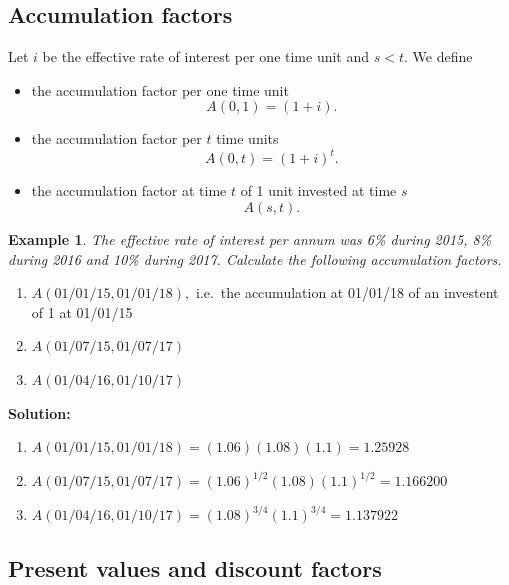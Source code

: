 \documentclass[
]{book}
\theoremstyle{definition}
\theoremstyle{definition}
\newtheorem{example}{Example}[chapter]
\theoremstyle{definition}
\theoremstyle{definition}
\theoremstyle{remark}
\begin{document}
\hypertarget{accumulation-factors}{%
\subsection{Accumulation factors}\label{accumulation-factors}}

Let \(i\) be the effective rate of interest per one time unit and \(s < t\).
We define

\begin{itemize}
\item
  the accumulation factor per one time unit \[A(0,1) = (1 + i).\]
\item
  the accumulation factor per \(t\) time units \[A(0,t) = (1 + i)^t.\]
\item
  the accumulation factor at time \(t\) of 1 unit invested at time \(s\)
  \[A(s,t).\]
\end{itemize}

\begin{example}

\emph{The effective rate of interest per annum was 6\% during 2015, 8\% during
2016 and 10\% during 2017. Calculate the following accumulation factors.}

\begin{enumerate}
\def\labelenumi{\arabic{enumi}.}
\item
  \(A(01/01/15, 01/01/18),\) i.e.~the accumulation at 01/01/18 of an
  investent of 1 at 01/01/15
\item
  \(A(01/07/15, 01/07/17)\)
\item
  \(A(01/04/16, 01/10/17)\)
\end{enumerate}

\end{example}

\textbf{Solution:}

\begin{enumerate}
\def\labelenumi{\arabic{enumi}.}
\item
  \(A(01/01/15, 01/01/18) = (1.06)(1.08)(1.1) = 1.25928\)
\item
  \(A(01/07/15, 01/07/17) = (1.06)^{1/2}(1.08)(1.1)^{1/2} = 1.166200\)
\item
  \(A(01/04/16, 01/10/17) = (1.08)^{3/4}(1.1)^{3/4} = 1.137922\)
\end{enumerate}

\hypertarget{present-values-and-discount-factors}{%
\subsection{Present values and discount factors}\label{present-values-and-discount-factors}}
\end{document}

